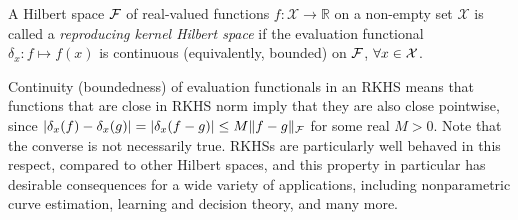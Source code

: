\begin{definition}\label{def:rkhs}
	A Hilbert space ${\mathcal F}$ of real-valued functions $f:\mathcal X \rightarrow \mathbb R$ on a non-empty set $\mathcal X$ is called a \emph{reproducing kernel Hilbert space} if the evaluation functional $\delta_x: f \mapsto f(x)$ is continuous (equivalently, bounded) on ${\mathcal F}$, $\forall x \in {\mathcal X}$. 
\end{definition}

Continuity (boundedness) of evaluation functionals in an RKHS means that functions that are close in RKHS norm imply that they are also close pointwise, since $\vert \delta_x(f) - \delta_x(g) \vert = \vert \delta_x(f-g) \vert \leq M\Vert f-g \Vert_{\mathcal F}$ for some real $M>0$.
Note that the converse is not necessarily true.
RKHSs are particularly well behaved in this respect, compared to other Hilbert spaces, and this property in particular has desirable consequences for a wide variety of applications, including nonparametric curve estimation, learning and decision theory, and many more.

%
%

